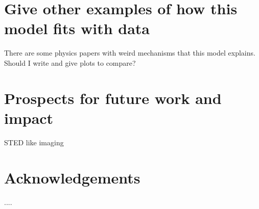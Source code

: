 \documentclass[preprint,prl]{revtex4}
\begin{document}
\section{Give other examples of how this model fits with data}
There are some physics papers with weird mechanisms that this model explains. Should I write and give plots to compare?


\section{Prospects for future work and impact}
STED like imaging



\section{}


































 






%


\section*{Acknowledgements}

....

%
%
%




\begin{thebibliography}{27}






\end{thebibliography}
\end{document}
